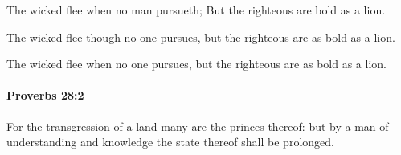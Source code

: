 			\begin{versebox}
					\item[BHS] 
					\item[ASV] The wicked flee when no man pursueth; But the righteous are bold as a lion.
					\item[NIV] The wicked flee though no one pursues, but the righteous are as bold as a lion.
					\item[NRSV] The wicked flee when no one pursues, but the righteous are as bold as a lion.
			\end{versebox}

		\paragraph{Proverbs 28:2} %
			\label{PROVERBS-28-2}

			For the transgression of a land many are the princes thereof: but by a man of understanding and knowledge the state thereof shall be prolonged.

